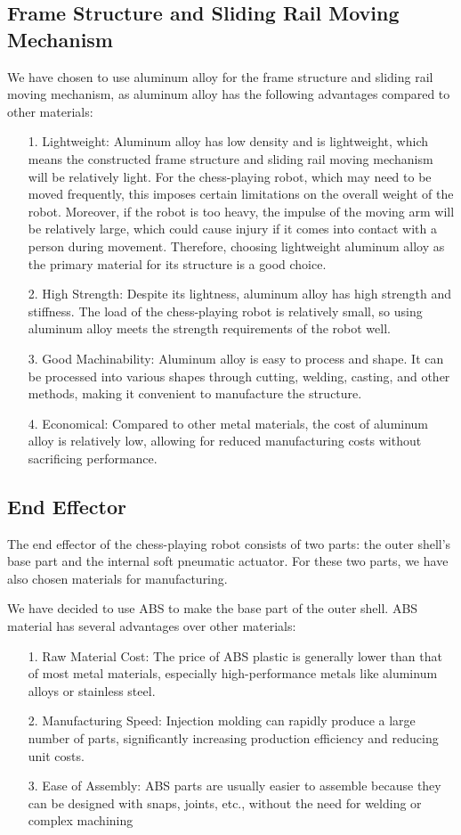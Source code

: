 \documentclass[10pt, a4paper, twocolumn]{article}
\begin{document}
\subsection{Frame Structure and Sliding Rail Moving Mechanism}
We have chosen to use aluminum alloy for the frame structure and sliding rail moving mechanism, as aluminum alloy has the following advantages compared to other materials:
\begin{itemize}
    \item [1.] Lightweight: Aluminum alloy has low density and is lightweight, which means the constructed frame structure and sliding rail moving mechanism will be relatively light. For the chess-playing robot, which may need to be moved frequently, this imposes certain limitations on the overall weight of the robot. Moreover, if the robot is too heavy, the impulse of the moving arm will be relatively large, which could cause injury if it comes into contact with a person during movement. Therefore, choosing lightweight aluminum alloy as the primary material for its structure is a good choice.
    \item [2.] High Strength: Despite its lightness, aluminum alloy has high strength and stiffness. The load of the chess-playing robot is relatively small, so using aluminum alloy meets the strength requirements of the robot well.
    \item [3.] Good Machinability: Aluminum alloy is easy to process and shape. It can be processed into various shapes through cutting, welding, casting, and other methods, making it convenient to manufacture the structure.
    \item [4.] Economical: Compared to other metal materials, the cost of aluminum alloy is relatively low, allowing for reduced manufacturing costs without sacrificing performance.
\end{itemize}

\subsection{End Effector}
The end effector of the chess-playing robot consists of two parts: the outer shell's base part and the internal soft pneumatic actuator. For these two parts, we have also chosen materials for manufacturing.

We have decided to use ABS to make the base part of the outer shell. ABS material has several advantages over other materials:
\begin{itemize}
    \item [1.] Raw Material Cost: The price of ABS plastic is generally lower than that of most metal materials, especially high-performance metals like aluminum alloys or stainless steel.
    \item [2.] Manufacturing Speed: Injection molding can rapidly produce a large number of parts, significantly increasing production efficiency and reducing unit costs.
    \item [3.] Ease of Assembly: ABS parts are usually easier to assemble because they can be designed with snaps, joints, etc., without the need for welding or complex machining
\end{itemize}
\end{document}
